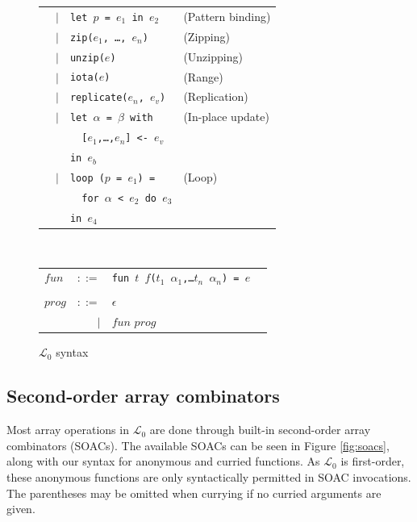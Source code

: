\documentclass{sigplanconf}  %
\newcommand{\LO}{$\mathcal{L}_0$}
\begin{document}
\begin{figure}[bt]
\begin{tabular}{lrll}
& $|$ & {\tt let $p$ = $e_{1}$ in $e_{2}$} & (Pattern binding) \\
& $|$ & {\tt zip($e_{1}$, \ldots, $e_{n}$)} & (Zipping) \\
& $|$ & {\tt unzip($e$)} & (Unzipping) \\
& $|$ & {\tt iota($e$)} & (Range) \\
& $|$ & {\tt replicate($e_{n}$, $e_{v}$)} & (Replication) \\
& $|$ & {\tt let $\alpha$ = $\beta$ with} & (In-place update) \\
&     & {\tt \ \ [$e_{1}$,\ldots,$e_{n}$] <- $e_{v}$} \\
&     & {\tt in $e_{b}$} \\
& $|$ & {\tt loop ($p$ = $e_{1}$) =} & (Loop) \\
&     & {\tt \ \ for $\alpha$ < $e_{2}$ do $e_{3}$} \\
&     & {\tt in $e_{4}$} \\
\end{tabular}
\\
\begin{tabular}{lrll}
$fun$ & $::=$ & {\tt fun $t$ $f$($t_{1}$ $\alpha_{1}$,\ldots $t_{n}$ $\alpha_{n}$) = $e$} \\
\\
$prog$ & $::=$ & $\epsilon$ \\
       & $|$   & $fun$ $prog$
\end{tabular}
\caption{\LO{} syntax}
\label{fig:fo-syntax}
\end{figure}

\subsection{Second-order array combinators}
\label{sec:soacs}

Most array operations in \LO{} are done through built-in second-order
array combinators (SOACs).  The available SOACs can be seen in Figure
\ref{fig:soacs}, along with our syntax for anonymous and curried
functions.  As \LO{} is first-order, these anonymous functions are
only syntactically permitted in SOAC invocations.  The parentheses may
be omitted when currying if no curried arguments are given.
\end{document}
